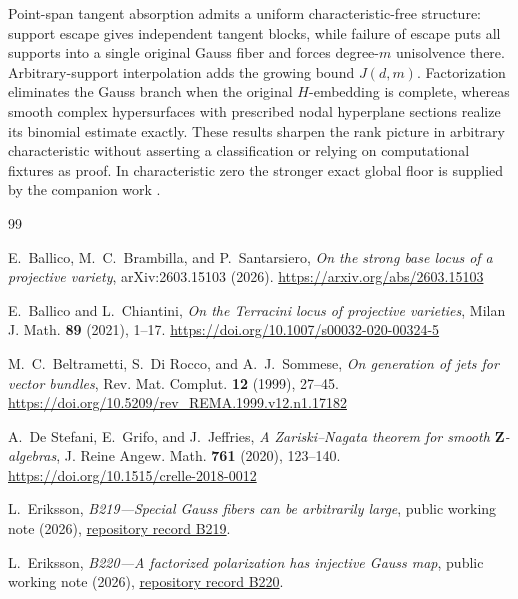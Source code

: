 \documentclass[11pt]{article}
\begin{document}
Point-span tangent absorption admits a uniform characteristic-free structure:
support escape gives independent tangent blocks, while failure of escape puts
all supports into a single original Gauss fiber and forces degree-$m$
unisolvence there.  Arbitrary-support interpolation adds the growing bound
$J(d,m)$.  Factorization eliminates the Gauss branch when the original
$H$-embedding is complete, whereas smooth complex hypersurfaces with prescribed nodal hyperplane
sections realize its binomial estimate exactly.  These results sharpen the
rank picture in arbitrary characteristic without asserting a classification
or relying on computational fixtures as proof.  In characteristic zero the
stronger exact global floor is supplied by the companion work
\cite{ErikssonExactARR2026}.

\begin{thebibliography}{99}

E.~Ballico, M.~C.~Brambilla, and P.~Santarsiero,
\emph{On the strong base locus of a projective variety},
arXiv:2603.15103 (2026).
\url{https://arxiv.org/abs/2603.15103}

E.~Ballico and L.~Chiantini,
\emph{On the Terracini locus of projective varieties},
Milan J. Math. \textbf{89} (2021), 1--17.
\url{https://doi.org/10.1007/s00032-020-00324-5}

M.~C.~Beltrametti, S.~Di Rocco, and A.~J.~Sommese,
\emph{On generation of jets for vector bundles},
Rev. Mat. Complut. \textbf{12} (1999), 27--45.
\url{https://doi.org/10.5209/rev_REMA.1999.v12.n1.17182}

A.~De Stefani, E.~Grifo, and J.~Jeffries,
\emph{A Zariski--Nagata theorem for smooth $\mathbf Z$-algebras},
J. Reine Angew. Math. \textbf{761} (2020), 123--140.
\url{https://doi.org/10.1515/crelle-2018-0012}

L.~Eriksson,
\emph{B219---Special Gauss fibers can be arbitrarily large},
public working note (2026),
\href{https://github.com/lluiseriksson/hodge-conjecture-research-front/blob/main/proofs/B219-arbitrarily-large-special-gauss-fibers.md}{repository record B219}.

L.~Eriksson,
\emph{B220---A factorized polarization has injective Gauss map},
public working note (2026),
\href{https://github.com/lluiseriksson/hodge-conjecture-research-front/blob/main/proofs/B220-factorized-polarization-has-injective-gauss-map.md}{repository record B220}.


\end{thebibliography}
\end{document}
